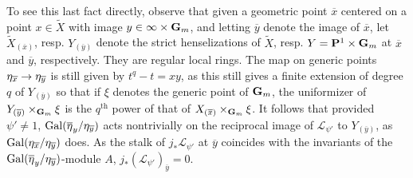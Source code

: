 \documentclass[deligne.tex]{subfiles}
\begin{document}
To see this last fact directly, observe that given a geometric point 
$\overline x$ centered on a point $x\in\tilde X$ with image
$y\in\infty\times\mathbf{G}_m$, and letting $\overline y$ denote the image of
$\overline x$, let $\tilde X_{(\overline x)}$, resp.
$Y_{(\overline y)}$ denote the strict henselizations of $\tilde X$, resp.
$Y=\mathbf{P}^1\times\mathbf{G}_m$ at $\overline x$ and $\overline y$, respectively.
They are regular local rings.
The map on generic points $\eta_{\overline x}\rightarrow\eta_{\overline y}$ is
still given by $t^q-t=xy$, as this still gives a finite extension of degree 
$q$ of $Y_{(\overline y)}$ so that if $\xi$ denotes the generic point of
$\mathbf{G}_m$, the uniformizer of $Y_{(\overline y)}\times_{\mathbf{G}_m}\xi$ is the
$q^{\text{th}}$ power of that of $X_{(\overline x)}\times_{\mathbf{G}_m}\xi$.
It follows that provided $\psi'\ne1$,
$\operatorname{Gal}(\overline\eta_y/\eta_{\overline y})$ acts nontrivially on the 
reciprocal image of $\mathscr L_{\psi'}$ to $Y_{(\overline y)}$,
as $\operatorname{Gal}(\eta_{\overline x}/\eta_{\overline y})$ does.
As the stalk of $j_*\mathscr L_{\psi'}$ at $\overline y$ coincides with
the invariants of the $\operatorname{Gal}(\overline\eta_y/\eta_{\overline y})$-module
$A$, $j_*(\mathscr L_{\psi'})_{\overline y}=0$.
\end{document}
